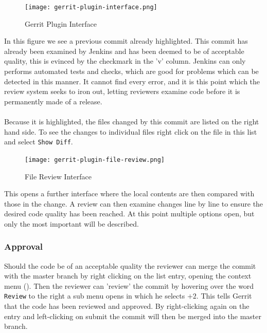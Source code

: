 \newpage

\begin{figure}[h] 
	\centering
	\texttt{[image: gerrit-plugin-interface.png]}
	\caption{Gerrit Plugin Interface}
	\label{fig:gerrit-plugin-interface}
\end{figure}

\noindent
In this figure we see a previous commit already highlighted. This commit has already been examined by Jenkins and has been deemed to be of acceptable quality, this is evinced by the checkmark in the 'v' column. Jenkins can only performs automated tests and checks, which are good for problems which can be detected in this manner. It cannot find every error, and it is this point which the review system seeks to iron out, letting reviewers examine code before it is permanently made of a release.\\
\\
Because it is highlighted, the files changed by this commit are listed on the right hand side. To see the changes to individual files right click on the file in this list and select \texttt{Show Diff}.\\

\begin{figure}[h] 
	\centering
	\texttt{[image: gerrit-plugin-file-review.png]}
	\caption{File Review Interface}
	\label{fig:gerrit-plugin-file-review}
\end{figure}

\noindent
This opens a further interface where the local contents are then compared with those in the change. A review can then examine changes line by line to ensure the desired code quality has been reached. At this point multiple options open, but only the most important will be described.\\

\subsubsection{Approval}

Should the code be of an acceptable quality the reviewer can merge the commit with the master branch by right clicking on the list entry, opening the context menu (). Then the reviewer can 'review' the commit by hovering over the word \texttt{Review} to the right a sub menu opens in which he selects \texttt{$+2$}. This tells Gerrit that the code has been reviewed and approved. By right-clicking again on the entry and left-clicking on submit the commit will then be merged into the master branch.

